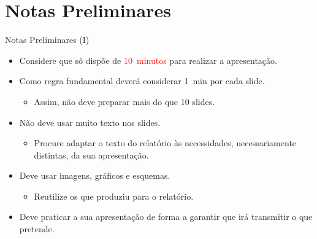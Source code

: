 
\section{Notas Preliminares}

\begin{frame}{Notas Preliminares (I)}

\setlstep{0.3cm}{0cm}{0cm}	%
\begin{itemize}
	\item Considere que só dispõe de \textcolor{red}{10~minutos} para realizar a apresentação.
	\item Como regra fundamental deverá considerar 1~min por cada slide.
	\begin{itemize}
		\item Assim, não deve preparar mais do que 10 slides.
	\end{itemize}
	\item Não deve usar muito texto nos slides.
	\begin{itemize}
		\item Procure adaptar o texto do relatório às necessidades, necessariamente distintas, da sua apresentação.
	\end{itemize}	
	\item Deve usar imagens, gráficos e esquemas.
	\begin{itemize}
		\item Reutilize os que produziu para o relatório.
	\end{itemize}	
	\item Deve praticar a sua apresentação de forma a garantir que irá transmitir o que pretende.
\end{itemize}

\end{frame}